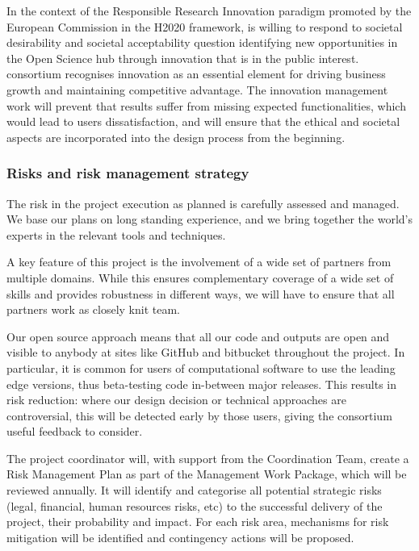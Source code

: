 In the context of the Responsible Research Innovation paradigm promoted by the European Commission in
the H2020 framework, \TheProject is willing to respond to societal desirability and societal acceptability
question identifying new opportunities in the Open Science hub through innovation that is in the public
interest. \TheProject consortium recognises innovation as an essential element for driving business growth
and maintaining competitive advantage. The innovation management work will prevent that \TheProject
results suffer from missing expected functionalities, which would lead to users dissatisfaction, and will
ensure that the ethical and societal aspects are incorporated into the design process from the beginning.

\subsubsection{Risks and risk management strategy}\label{sec:risks}

The risk in the project execution as planned is carefully assessed and
managed. We base our plans on long standing experience, and we bring
together the world's experts in the relevant tools and techniques.

A key feature of this project is the involvement of a wide set of
partners from multiple domains. While this ensures complementary
coverage of a wide set of skills and provides robustness in different
ways, we will have to ensure that all partners work as closely knit
team.

Our open source approach means that all our code and outputs
are open and visible to anybody at sites like GitHub and bitbucket
throughout the project. In particular, it is common for users of
computational software to use the leading edge versions, thus
beta-testing code in-between major releases. This results in risk
reduction: where our design decision or technical approaches are
controversial, this will be detected early by those users, giving the
consortium useful feedback to consider.

The project coordinator will, with support from the Coordination Team, create
a Risk Management Plan  as part of the Management
Work Package, which will be reviewed annually. It will identify and categorise all
potential strategic risks (legal, financial, human resources risks, etc)
to the successful delivery of the project, their probability and impact.
For each risk area, mechanisms for risk mitigation will be identified
and contingency actions will be proposed.

